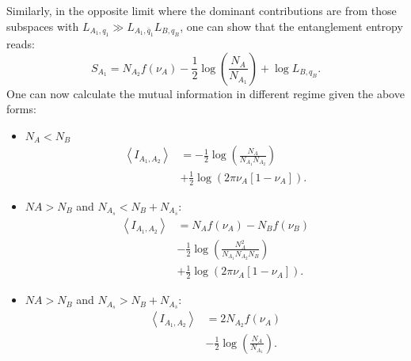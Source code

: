 \documentclass[aps,pra,reprint,superscriptaddress,twocolumn,notitlepage]{revtex4-1}
\numberwithin{equation}{section}
\begin{document}
Similarly, in the opposite limit where the  dominant contributions are from those subspaces with $L_{A_1,q_1} \gg L_{A_1,\bar{q}_1} L_{B,q_B}$, one can show that the entanglement entropy reads:
\begin{equation}
    S_{A_1} = N_{A_2} f(\nu_A) - \frac12 \log \left(  \frac{N_A}{ N_{A_1} } \right) + \log L_{B,q_B}.
\end{equation}
One can now calculate the mutual information in different regime given the above forms:
\begin{itemize}
    \item $N_A < N_B$
        \begin{equation}
        \begin{aligned}
            \left\langle     I_{A_1,A_2}\right\rangle &= - \frac12  \log\left( \frac{N_A}{N_{A_1} N_{A_2}}\right) \\
            &+ \frac12 \log\left( 2\pi \nu_A [1-\nu_A]   \right).
        \end{aligned}
        \end{equation}
    \item $NA>N_B$ and $N_{A_s} < N_B + N_{A_{\bar s}}$:
        \begin{equation}
        \begin{aligned}
            \left\langle     I_{A_1,A_2}\right\rangle &= 
            N_A f(\nu_A) - N_B f(\nu_B)\\
            &- \frac12  \log\left( \frac{N_A^2}{N_{A_1} N_{A_2} N_B}\right) \\
            &+ \frac12 \log\left( 2\pi \nu_A [1-\nu_A]   \right).
        \end{aligned}
        \end{equation}
    \item $NA>N_B$ and $N_{A_s} > N_B + N_{A_{\bar s}}$:
        \begin{equation}
        \begin{aligned}
        \label{eq:muinf-u1-me}
            \left\langle     I_{A_1,A_2}\right\rangle &= 
            2 N_{A_2} f(\nu_A) \\
            &- \frac12  \log\left( \frac{N_A}{N_{A_1} }\right) .
        \end{aligned}
        \end{equation}
\end{itemize}
\end{document}
